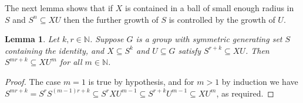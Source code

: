 \documentclass[10pt]{article}
\newcommand{\N}{\mathbb{N}}
\newtheorem{lemma}[lemma]{Lemma}
\begin{document}
The next lemma shows that if $X$ is contained in a ball of small enough radius in $S$ and $S^n\subseteq XU$ then the further growth of $S$ is controlled by the growth of $U$.


\begin{lemma}\label{lem:inclusions.local}
Let $k,r\in\N$. Suppose $G$ is a group with symmetric generating set $S$ containing the identity, and $X\subseteq S^k$ and $U\subseteq G$ satisfy $S^{r+k}\subseteq XU$. Then $S^{mr+k}\subseteq XU^m$ for all $m\in\N$.
\end{lemma}
\begin{proof}
The case $m=1$ is true by hypothesis, and for $m>1$ by induction we have $S^{mr+k}=S^rS^{(m-1)r+k}\subseteq S^rXU^{m-1}\subseteq S^{r+k}U^{m-1}\subseteq XU^m$, as required.
\end{proof}
\end{document}
